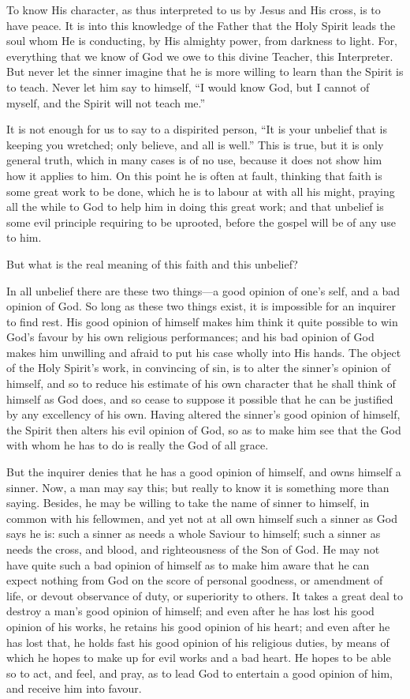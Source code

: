 \documentclass[
]{book}
\begin{document}
To know His character, as thus interpreted to us by Jesus and His cross, is to have peace. It is into this knowledge of the Father that the Holy Spirit leads the soul whom He is conducting, by His almighty power, from darkness to light. For, everything that we know of God we owe to this divine Teacher, this Interpreter. But never let the sinner imagine that he is more willing to learn than the Spirit is to teach. Never let him say to himself, ``I would know God, but I cannot of myself, and the Spirit will not teach me.''

It is not enough for us to say to a dispirited person, ``It is your unbelief that is keeping you wretched; only believe, and all is well.'' This is true, but it is only general truth, which in many cases is of no use, because it does not show him how it applies to him. On this point he is often at fault, thinking that faith is some great work to be done, which he is to labour at with all his might, praying all the while to God to help him in doing this great work; and that unbelief is some evil principle requiring to be uprooted, before the gospel will be of any use to him.

But what is the real meaning of this faith and this unbelief?

In all unbelief there are these two things---a good opinion of one's self, and a bad opinion of God. So long as these two things exist, it is impossible for an inquirer to find rest. His good opinion of himself makes him think it quite possible to win God's favour by his own religious performances; and his bad opinion of God makes him unwilling and afraid to put his case wholly into His hands. The object of the Holy Spirit's work, in convincing of sin, is to alter the sinner's opinion of himself, and so to reduce his estimate of his own character that he shall think of himself as God does, and so cease to suppose it possible that he can be justified by any excellency of his own. Having altered the sinner's good opinion of himself, the Spirit then alters his evil opinion of God, so as to make him see that the God with whom he has to do is really the God of all grace.

But the inquirer denies that he has a good opinion of himself, and owns himself a sinner. Now, a man may say this; but really to know it is something more than saying. Besides, he may be willing to take the name of sinner to himself, in common with his fellowmen, and yet not at all own himself such a sinner as God says he is: such a sinner as needs a whole Saviour to himself; such a sinner as needs the cross, and blood, and righteousness of the Son of God. He may not have quite such a bad opinion of himself as to make him aware that he can expect nothing from God on the score of personal goodness, or amendment of life, or devout observance of duty, or superiority to others. It takes a great deal to destroy a man's good opinion of himself; and even after he has lost his good opinion of his works, he retains his good opinion of his heart; and even after he has lost that, he holds fast his good opinion of his religious duties, by means of which he hopes to make up for evil works and a bad heart. He hopes to be able so to act, and feel, and pray, as to lead God to entertain a good opinion of him, and receive him into favour.
\end{document}
